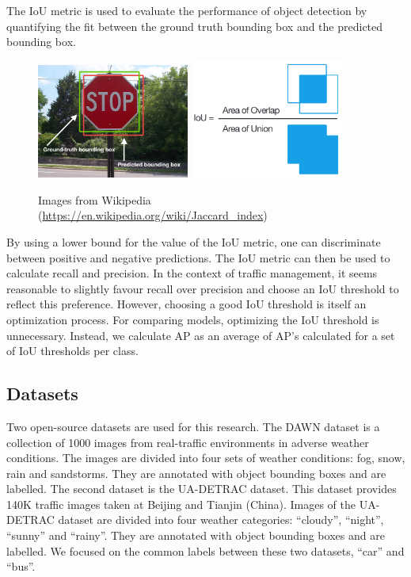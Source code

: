\documentclass[]{article}
\begin{document}
	The IoU metric is used to evaluate the performance of object detection by quantifying the fit between the ground truth bounding box and the predicted bounding box.
	
	\begin{figure}[h]
		\centering
		\includegraphics[width=5cm]{Intersection_over_Union_-_object_detection_bounding_boxes.jpg}
		\includegraphics[width=5cm]{Intersection_over_Union_-_visual_equation.png}
		\caption{Images from Wikipedia \footnotesize{(\url{https://en.wikipedia.org/wiki/Jaccard_index})}}
	\end{figure}
	
	By using a lower bound for the value of the IoU metric, one can discriminate between positive and negative predictions. The IoU metric can then be used to calculate recall and precision. In the context of traffic management, it seems reasonable to slightly favour recall over precision and choose an IoU threshold to reflect this preference. However, choosing a good IoU threshold is itself an optimization process. For comparing models, optimizing the IoU threshold is unnecessary. Instead, we calculate AP as an average of AP's calculated for a set of IoU thresholds per class.

\subsection{Datasets}

	Two open-source datasets are used for this research. The DAWN dataset \cite{bw1x-yh39-20} is a collection of 1000 images from real-traffic environments in adverse weather conditions. The images are divided into four sets of weather conditions: fog, snow, rain and sandstorms. They are annotated with object bounding boxes and are labelled.  The second dataset is the UA-DETRAC \cite{CVIU_UA-DETRAC} dataset. This dataset provides 140K traffic images taken at Beijing and Tianjin (China). Images of the UA-DETRAC dataset are divided into four weather categories: ``cloudy'', ``night'', ``sunny'' and ``rainy''. They are annotated with object bounding boxes and are labelled.  We focused on the common labels between these two datasets, ``car'' and ``bus''.
\end{document}
